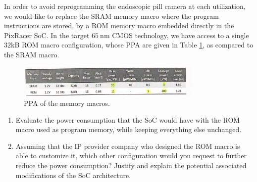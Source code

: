 \documentclass[fr]{sourcefiles/eplexam} %
\begin{document}
\noindent In order to avoid reprogramming the endoscopic pill camera at each utilization, we would like to replace the SRAM memory macro where the program instructions are stored, by a ROM memory macro embedded directly in the PixRacer SoC. In the target $65 \mathrm{~nm}$ CMOS technology, we have access to a single $32$kB ROM macro configuration, whose PPA are given in Table \ref{table1}, as compared to the SRAM macro.

\begin{figure}[h]
    \centering
    \includegraphics[width=0.8\textwidth]{ProjectQuestionP2.png}
    \caption{PPA of the memory macros.}
    \label{table1}
\end{figure}


\begin{enumerate}
    \item Evaluate the power consumption that the SoC would have with the ROM macro used as program memory, while keeping everything else unchanged.
    \item Assuming that the IP provider company who designed the ROM macro is able to customize it, which other configuration would you request to further reduce the power consumption? Justify and explain the potential associated modifications of the SoC architecture.
\end{enumerate}

\nosolution
\end{document}
